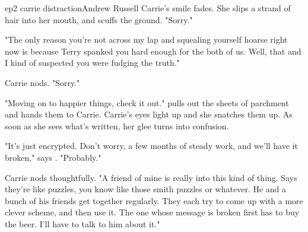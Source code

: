 \documentclass{book}
\begin{document}
\begin{childnode}{ep2 carrie distraction}{Andrew Russell}
    Carrie's smile fades. She slips a strand of hair into her mouth, and scuffs the ground. "Sorry."

    "The only reason you're not across my lap and squealing yourself hoarse right now is because Terry spanked you hard enough for the both of us. Well, that and I kind of suspected you were
    fudging the truth."

    Carrie nods. "Sorry."
    
    "Moving on to happier things, check it out." \name{} pulls out the sheets of parchment and hands them to Carrie. Carrie's eyes light up and she snatches them up. As soon as she sees what's 
    written, her glee turns into confusion.

    "It's just encrypted. Don't worry, a few months of steady work, and we'll have it broken," says \name{}. "Probably."

    Carrie nods thoughtfully. "A friend of mine is really into this kind of thing. Says they're like puzzles, you know like those smith puzzles or whatever. He and a bunch of his friends get together
    regularly. They each try to come up with a more clever scheme, and then use it. The one whose message is broken first has to buy the beer. I'll have to talk to him about it."


\end{childnode}
\end{document}

